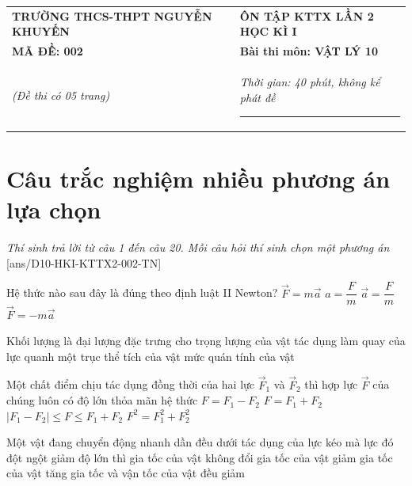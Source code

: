 \begin{center}
	\begin{tabular}{M{10cm}M{8cm}}
		\textbf{TRƯỜNG THCS-THPT NGUYỄN KHUYẾN}& \textbf{ÔN TẬP KTTX LẦN 2 HỌC KÌ I}\\
		\textbf{MÃ ĐỀ: 002}& \textbf{Bài thi môn: VẬT LÝ 10}\\
		\textit{(Đề thi có 05 trang)}& \textit{Thời gian: 40 phút, không kể phát đề}
		
		\noindent\rule{4cm}{0.8pt} \\
	\end{tabular}
\end{center}
\setcounter{section}{0}
\section{Câu trắc nghiệm nhiều phương án lựa chọn}
\textit{Thí sinh trả lời từ câu 1 đến câu 20. Mỗi câu hỏi thí sinh chọn một phương án}
\setcounter{ex}{0}
[ans/D10-HKI-KTTX2-002-TN]
\begin{ex}
	Hệ thức nào sau đây là đúng theo định luật II Newton?
	\choice
	{\True $\vec{F}=m\vec{a}$}
	{$a=\dfrac{F}{m}$}
	{$\vec{a}=\dfrac{F}{m}$}
	{$\vec{F}=-m\vec{a}$}
	\loigiai{}
\end{ex}
\begin{ex}
	Khối lượng là đại lượng đặc trưng cho
	\choice
	{trọng lượng của vật}
	{tác dụng làm quay của lực quanh một trục}
	{thể tích của vật}
	{\True mức quán tính của vật}
	\loigiai{}
\end{ex}
\begin{ex}
	Một chất điểm chịu tác dụng đồng thời của hai lực $\vec{F}_1$ và $\vec{F}_2$ thì hợp lực $\vec{F}$ của chúng luôn có độ lớn thỏa mãn hệ thức	
	\choice
	{$F=F_1-F_2$}
	{$F=F_1+F_2$}
	{\True $\left|F_1-F_2\right|\le F\le F_1+F_2$}
	{$F^2=F^2_1+F^2_2$}
	\loigiai{}
\end{ex}
\begin{ex}
	Một vật đang chuyển động nhanh dần đều dưới tác dụng của lực kéo mà lực đó đột ngột giảm độ lớn thì
	\choice
	{gia tốc của vật không đổi}
	{\True gia tốc của vật giảm}
	{gia tốc của vật tăng}
	{gia tốc và vận tốc của vật đều giảm}
	\loigiai{}
\end{ex}
